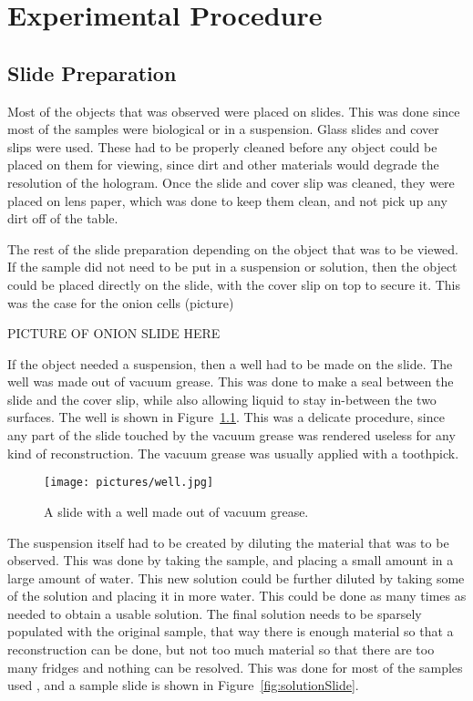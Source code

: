 %
%
%

\chapter{Experimental Procedure} \label{chap:Experimental}

\section{Slide Preparation}

Most of the objects that was observed were placed on slides. This was done
since most of the samples were biological or in a suspension. Glass slides and
cover slips were used. These had to be properly cleaned before any object could
be placed on them for viewing, since dirt and other materials would degrade the
resolution of the hologram. Once the slide and cover slip was cleaned, they
were placed on lens paper, which was done to keep them clean, and not pick up
any dirt off of the table.

The rest of the slide preparation depending on the object that was to be
viewed. If the sample did not need to be put in a suspension or solution, then
the object could be placed directly on the slide, with the cover slip on top to
secure it. This was the case for the onion cells (picture)

PICTURE OF ONION SLIDE HERE

If the object needed a suspension, then a well had to be made on the slide. The
well was made out of vacuum grease. This was done to make a seal between the
slide and the cover slip, while also allowing liquid to stay in-between the two
surfaces.
The well is shown in Figure~\ref{fig:well}.
This was a delicate procedure, since any part of the slide touched by the
vacuum grease was rendered useless for any kind of reconstruction. The vacuum
grease was usually applied with a toothpick.

\begin{figure}[htbp!]
\begin{center}
    \texttt{[image: pictures/well.jpg]}
\end{center}
\caption{A slide with a well made out of vacuum grease.}
\label{fig:well}
\end{figure}

The suspension itself had to be created by diluting the material that was to be
observed. This was done by taking the sample, and placing a small amount in a
large amount of water. This new solution could be further diluted by taking
some of the solution and placing it in more water. This could be done as many
times as needed to obtain a usable solution. The final solution needs to be
sparsely populated with the original sample, that way there is enough material
so that a reconstruction can be done, but not too much material so that there
are too many fridges and nothing can be resolved. This was done for most of the
samples used%
, and a sample slide is shown in Figure~\ref{fig:solutionSlide}.

